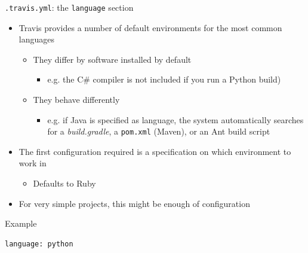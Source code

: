 \documentclass[presentation]{beamer}
\begin{document}
\begin{frame}[fragile]{\texttt{.travis.yml}: the \texttt{language} section}
    \begin{itemize}
        \item Travis provides a number of default environments for the most common languages
        \begin{itemize}
            \item They differ by software installed by default
            \begin{itemize}
                \item e.g. the C\# compiler is not included if you run a Python build)
            \end{itemize}
            \item They behave differently
            \begin{itemize}
                \item e.g. if Java is specified as language, the system automatically searches for a \textit{build.gradle}, a \texttt{pom.xml} (Maven), or an Ant build script
            \end{itemize}
        \end{itemize}
        \item The first configuration required is a specification on which environment to work in
        \begin{itemize}
            \item Defaults to Ruby
        \end{itemize}
        \item For very simple projects, this might be enough of configuration
    \end{itemize}
    \begin{block}{Example}
        \begin{verbatim}
language: python
        \end{verbatim}
    \end{block}
\end{frame}
\end{document}
